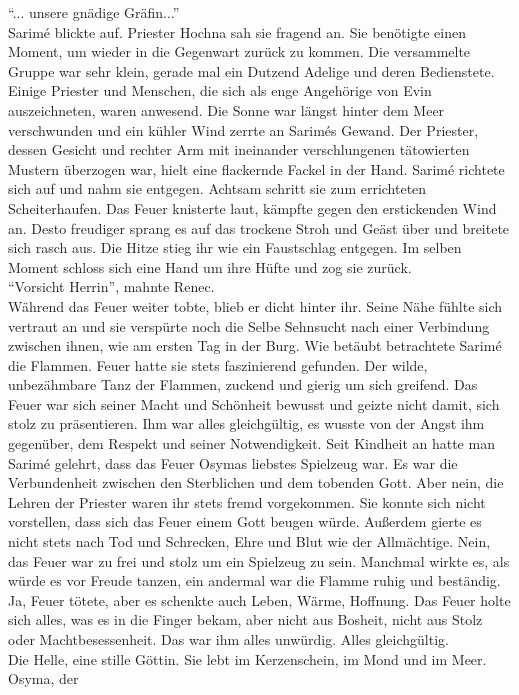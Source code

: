 ``... unsere gnädige Gräfin...''\\
Sarimé blickte auf. Priester Hochna sah sie fragend an. Sie benötigte einen Moment, um wieder in 
die Gegenwart zurück zu kommen. Die versammelte Gruppe war sehr klein, gerade mal ein Dutzend 
Adelige und deren Bedienstete. Einige Priester und Menschen, die sich als enge Angehörige von Evin 
auszeichneten, waren anwesend. Die Sonne war längst hinter dem Meer verschwunden und ein kühler 
Wind zerrte an Sarimés Gewand. Der Priester, dessen Gesicht und rechter Arm mit ineinander 
verschlungenen tätowierten Mustern überzogen war, hielt eine flackernde Fackel in der Hand. Sarimé 
richtete sich auf und nahm sie entgegen. Achtsam schritt sie zum errichteten Scheiterhaufen. 
Das Feuer knisterte laut, kämpfte gegen den erstickenden Wind an. Desto freudiger sprang es auf das 
trockene Stroh und Geäst über und breitete sich rasch aus. Die Hitze stieg ihr wie ein Faustschlag 
entgegen. Im selben Moment schloss sich eine Hand um ihre Hüfte und zog sie zurück. \\
``Vorsicht Herrin'', mahnte Renec. \\
Während das Feuer weiter tobte, blieb er dicht hinter ihr. Seine Nähe fühlte sich vertraut an und 
sie verspürte noch die Selbe Sehnsucht nach einer Verbindung zwischen ihnen, wie am ersten Tag in 
der Burg. Wie betäubt betrachtete Sarimé die Flammen. Feuer hatte sie stets faszinierend gefunden. 
Der wilde, unbezähmbare Tanz der Flammen, zuckend und gierig um sich greifend. Das Feuer war sich 
seiner Macht und Schönheit bewusst und geizte nicht damit, sich stolz zu präsentieren. Ihm war  
alles gleichgültig, es wusste von der Angst ihm gegenüber, dem Respekt und seiner Notwendigkeit. 
Seit Kindheit an hatte man Sarimé gelehrt, dass das Feuer Osymas liebstes Spielzeug war. Es war die 
Verbundenheit zwischen den Sterblichen und dem tobenden Gott. Aber nein, die Lehren der Priester 
waren ihr stets fremd vorgekommen. Sie konnte sich nicht vorstellen, dass sich das Feuer einem Gott 
beugen würde. Außerdem gierte es nicht stets nach Tod und Schrecken, Ehre und Blut wie der 
Allmächtige. Nein, das Feuer war zu frei und stolz um ein Spielzeug zu sein. Manchmal wirkte es, 
als würde es vor Freude tanzen, ein andermal war die Flamme ruhig und beständig. Ja, Feuer tötete, 
aber es schenkte auch Leben, Wärme, Hoffnung. Das Feuer holte sich alles, was es in die Finger 
bekam, aber nicht aus Bosheit, nicht aus Stolz oder Machtbesessenheit. Das war ihm alles unwürdig. 
Alles gleichgültig.\\
Die Helle, eine stille Göttin. Sie lebt im Kerzenschein, im Mond und im Meer.  Osyma, der 
